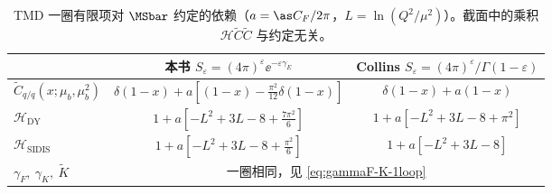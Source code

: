 \begin{table}[htbp]
\centering
\caption{TMD 一圈有限项对 $\MSbar$ 约定的依赖（$a=\as C_F/2\pi$，$L=\ln(Q^2/\mu^2)$）。截面中的乘积 $\mathcal H\tilde C\tilde C$ 与约定无关。}
\label{tab:tmd-scheme}
\begin{tabular}{lcc}
\toprule
 & 本书 $S_\varepsilon=(4\pi)^\varepsilon\ee^{-\varepsilon\gamma_E}$ & Collins $S_\varepsilon=(4\pi)^\varepsilon/\Gamma(1-\varepsilon)$\\
\midrule
$\tilde C_{q/q}(x;\mu_b,\mu_b^2)$ & $\delta(1-x)+a[(1-x)-\frac{\pi^2}{12}\delta(1-x)]$ & $\delta(1-x)+a(1-x)$\\
$\mathcal H_{\mathrm{DY}}$ & $1+a[-L^2+3L-8+\frac{7\pi^2}6]$ & $1+a[-L^2+3L-8+\pi^2]$\\
$\mathcal H_{\mathrm{SIDIS}}$ & $1+a[-L^2+3L-8+\frac{\pi^2}6]$ & $1+a[-L^2+3L-8]$\\
$\gamma_F,\ \gamma_K,\ \tilde K$ & \multicolumn{2}{c}{一圈相同，见 \eqref{eq:gammaF-K-1loop}}\\
\bottomrule
\end{tabular}
\end{table}
